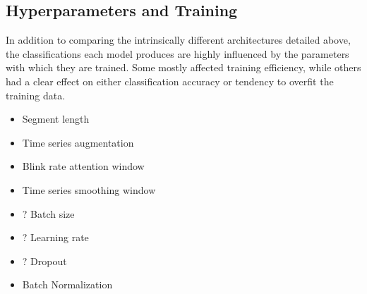 \newpage
\subsection{Hyperparameters and Training}

In addition to comparing the intrinsically different architectures detailed above, the classifications each model produces are highly influenced by the parameters with which they are trained. Some mostly affected training efficiency, while others had a clear effect on either classification accuracy or tendency to overfit the training data.

\begin{itemize}
    \item Segment length
    \item Time series augmentation
    \item Blink rate attention window
    \item Time series smoothing window
    \item ? Batch size
    \item ? Learning rate
    \item ? Dropout
    \item Batch Normalization
\end{itemize}